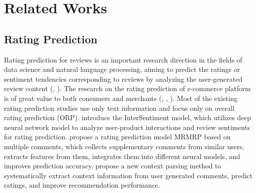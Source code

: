 \documentclass[preprint,12pt]{elsarticle}
\begin{document}

\section{Related Works}
\subsection{Rating Prediction}
Rating prediction for reviews is an important research direction in the fields of data science and natural language processing, aiming to predict the ratings or sentiment tendencies corresponding to reviews by analyzing the user-generated review content (\citep{liu2022sentiment}, \citep{Khan2021deep}). The research on the rating prediction of e-commerce platform is of great value to both consumers and merchants (\citep{Xiong2024review}, \citep{Dhillon2021modeling}, \citep{zhou2024product} ). Most of the existing rating prediction studies use only text information and focus only on overall rating prediction (ORP). \citet{feng2021intersentiment} introduce the InterSentiment model, which utilizes deep neural network model to analyze user-product interactions and review sentiments for rating prediction.\citet{wang2020MRMRP} propose a rating prediction model MRMRP based on multiple comments, which collects supplementary comments from similar users, extracts features from them, integrates them into different neural models, and improves prediction accuracy. \citet{Bauman2022knowthy} propose a new context parsing method to systematically extract context information from user generated comments, predict ratings, and improve recommendation performance.
\end{document}
